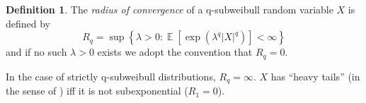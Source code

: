 \documentclass{article}
\theoremstyle{definition}
\newtheorem{definition}{Definition}[section]
\DeclareMathOperator{\E}{\mathbb{E}}
\DeclareMathOperator{\given}{\left.\right|}
\begin{document}

\begin{definition}
\label{def:radius-convergence}
The \textit{radius of convergence} of a q-subweibull random variable $X$ is defined by
\[R_q = \sup \left\{\lambda>0:\E[\exp(\lambda^q \vert X\vert^q)]<\infty\right\}\]
and if no such $\lambda>0$ exists we adopt the convention that $R_q=0$.
\end{definition}
In the case of strictly q-subweibull distributions, $R_q=\infty$. 
$X$ has ``heavy tails'' (in the sense of \cite{nairFundamentalsHeavyTails2022}) iff it is not subexponential ($R_1=0$).
\end{document}
